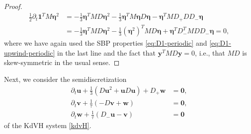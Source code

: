 \documentclass{article}
\newcommand{\ukdv}{\eta}
\begin{document}
\begin{proof}
\begin{equation}
    \begin{aligned}
        \frac{1}{2} \partial_t \pmb{1}^T M \pmb{\ukdv}^2
        &=
        - \frac{1}{3} \pmb{\ukdv}^T M D \pmb{\ukdv}^2
        - \frac{1}{3} \pmb{\ukdv}^T M \pmb{\ukdv} D \pmb{\ukdv}
        - \pmb{\ukdv}^T M D_+ D D_- \pmb{\ukdv}
        \\
        &=
        - \frac{1}{3} \pmb{\ukdv}^T M D \pmb{\ukdv}^2
        - \frac{1}{3} (\pmb{\ukdv}^2)^T M D \pmb{\ukdv}
        + \pmb{\ukdv}^T D_-^T M D D_- \pmb{\ukdv}
        =
        0,
    \end{aligned}
    \end{equation}
    where we have again used the SBP properties \eqref{eq:D1-periodic}
    and \eqref{eq:D1-upwind-periodic} in the last line and
    the fact that $\pmb{y}^T M D \pmb{y} = 0$, i.e., that $M D$ is
    skew-symmetric in the usual sense.
\end{proof}

Next, we consider the semidiscretization
\begin{equation}
\label{eq:KdVH-semidiscrete}
\begin{aligned}
    \partial_t \pmb{u}
    + \frac{1}{3} \left( D \pmb{u}^2 + \pmb{u} D \pmb{u} \right) + D_+ \pmb{w} &= \pmb{0},
    \\
    \partial_t \pmb{v}
    + \frac{1}{\tau} \left( -D \pmb{v} + \pmb{w} \right) &= \pmb{0},
    \\
    \partial_t \pmb{w}
    + \frac{1}{\tau} \left( D_- \pmb{u} - \pmb{v} \right) &= \pmb{0}
\end{aligned}
\end{equation}
of the KdVH system \eqref{kdvH}.
\end{document}
